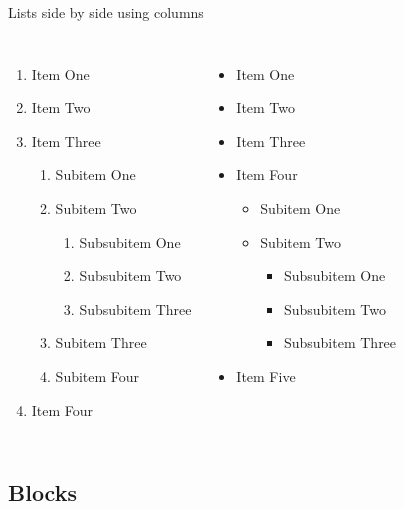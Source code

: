 \documentclass{beamer}
\begin{document}
\begin{frame}{Lists side by side using columns}
	\scriptsize
	\begin{columns}[T, onlytextwidth]
		\begin{enumerate}
			\item  Item One    
			\item  Item Two     
			\item  Item Three   
			\begin{enumerate}
				\item  Subitem One
				\item  Subitem Two
				\begin{enumerate}
					\item  Subsubitem One
					\item  Subsubitem Two
					\item  Subsubitem Three
				\end{enumerate}
				\item  Subitem Three
				\item  Subitem Four	
			\end{enumerate}
			\item Item Four		
		\end{enumerate}
		
		\begin{itemize}
			\item  Item One
			\item  Item Two
			\item  Item Three
			\item  Item Four
			\begin{itemize}
				\item  Subitem One
				\item  Subitem Two
				\begin{itemize}
					\item  Subsubitem One
					\item  Subsubitem Two
					\item  Subsubitem Three
				\end{itemize}
			\end{itemize}
			\item Item Five
		\end{itemize}
		
	\end{columns}
\end{frame}

\subsection{Blocks}
\end{document}
